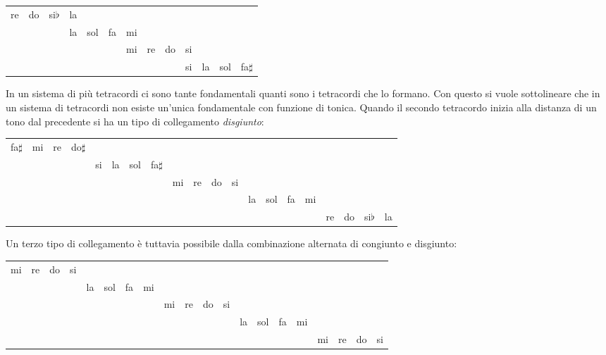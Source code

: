 \begin{center}\small
{\setlength{\tabcolsep}{3pt}%
\begin{tabular}{@{}lllllllllllll@{}}
re & do & si$\flat$ & la & & & & & & & & \\
& & & la & sol & fa & mi & & & & & \\
& & & & & & mi & re & do & si & & \\
& & & & & & & & & si & la & sol & fa$\sharp$ \\
\end{tabular}}
\end{center}

In un sistema di più tetracordi ci sono tante fondamentali quanti sono i
tetracordi che lo formano. Con questo si vuole sottolineare che in un sistema
di tetracordi non esiste un'unica fondamentale con funzione di tonica.
Quando il secondo tetracordo inizia alla distanza di un tono dal precedente si
ha un tipo di collegamento \emph{disgiunto}:

\begin{center}\small
{\setlength{\tabcolsep}{3pt}%
\begin{tabular}{@{}llllllllllllllllllll@{}}
fa$\sharp$ & mi & re & do$\sharp$ & & & & & & & & & & & & & & & & \\
& & & & si & la & sol & fa$\sharp$ & & & & & & & & & & & & \\
& & & & & & & & mi & re & do & si & & & & & & & & \\
& & & & & & & & & & & & la & sol & fa & mi & & & & \\
& & & & & & & & & & & & & & & & re & do & si$\flat$ & la \\
\end{tabular}}
\end{center}


Un terzo tipo di collegamento è tuttavia possibile dalla combinazione alternata
di congiunto e disgiunto:

\begin{center}\small
{\setlength{\tabcolsep}{3pt}%
\begin{tabular}{@{}llllllllllllllllllll@{}}
mi & re & do & si & & & & & & & & & & & & & & & & \\
& & & & la & sol & fa & mi & & & & & & & & & & & & \\
& & & & & & & & mi & re & do & si & & & & & & & & \\
& & & & & & & & & & & & la & sol & fa & mi & & & & \\
& & & & & & & & & & & & & & & & mi & re & do & si \\
\end{tabular}}
\end{center}


